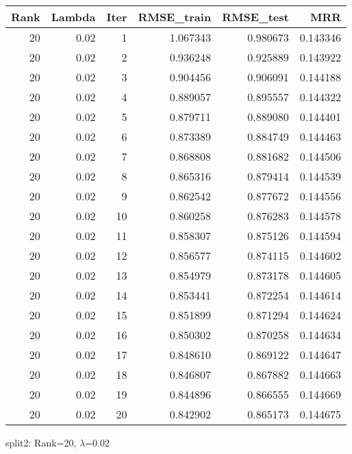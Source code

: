 \begin{tabular}{rrrrrr}
\toprule
 Rank &  Lambda &  Iter &  RMSE\_train &  RMSE\_test &       MRR \\
\midrule
   20 &    0.02 &     1 &    1.067343 &   0.980673 &  0.143346 \\
   20 &    0.02 &     2 &    0.936248 &   0.925889 &  0.143922 \\
   20 &    0.02 &     3 &    0.904456 &   0.906091 &  0.144188 \\
   20 &    0.02 &     4 &    0.889057 &   0.895557 &  0.144322 \\
   20 &    0.02 &     5 &    0.879711 &   0.889080 &  0.144401 \\
   20 &    0.02 &     6 &    0.873389 &   0.884749 &  0.144463 \\
   20 &    0.02 &     7 &    0.868808 &   0.881682 &  0.144506 \\
   20 &    0.02 &     8 &    0.865316 &   0.879414 &  0.144539 \\
   20 &    0.02 &     9 &    0.862542 &   0.877672 &  0.144556 \\
   20 &    0.02 &    10 &    0.860258 &   0.876283 &  0.144578 \\
   20 &    0.02 &    11 &    0.858307 &   0.875126 &  0.144594 \\
   20 &    0.02 &    12 &    0.856577 &   0.874115 &  0.144602 \\
   20 &    0.02 &    13 &    0.854979 &   0.873178 &  0.144605 \\
   20 &    0.02 &    14 &    0.853441 &   0.872254 &  0.144614 \\
   20 &    0.02 &    15 &    0.851899 &   0.871294 &  0.144624 \\
   20 &    0.02 &    16 &    0.850302 &   0.870258 &  0.144634 \\
   20 &    0.02 &    17 &    0.848610 &   0.869122 &  0.144647 \\
   20 &    0.02 &    18 &    0.846807 &   0.867882 &  0.144663 \\
   20 &    0.02 &    19 &    0.844896 &   0.866555 &  0.144669 \\
   20 &    0.02 &    20 &    0.842902 &   0.865173 &  0.144675 \\
\bottomrule
\end{tabular}

\caption{split2: Rank=20, $\lambda$=0.02}
